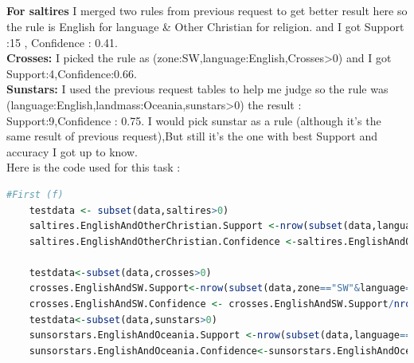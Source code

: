 \documentclass{article}
\begin{document}
	\subsection*{}
	\textbf{For saltires} I merged two rules from previous request to get better result here so the rule is English for language \& Other Christian for religion. and I got Support :15 , Confidence : 0.41.\\
	\textbf{Crosses:} I picked the rule as (zone:SW,language:English,Crosses>0) and I got Support:4,Confidence:0.66.\\
	\textbf{Sunstars:} I used the previous request tables to help me judge so the rule was (language:English,landmass:Oceania,sunstars>0) the result : Support:9,Confidence : 0.75.
	I would pick sunstar as a rule (although it's the same result of previous request),But still it's the one with best Support and accuracy I got up to know.\\
	Here is the code used for this task :
	\begin{lstlisting}[language=R]
	#First (f)
	testdata <- subset(data,saltires>0)
	saltires.EnglishAndOtherChristian.Support <-nrow(subset(data,language=="English"&religion=="Other Christian" & saltires>0))
	saltires.EnglishAndOtherChristian.Confidence <-saltires.EnglishAndOtherChristian.Support /nrow(subset(data,language=="English"&religion=="Other Christian"))
	
	testdata<-subset(data,crosses>0)
	crosses.EnglishAndSW.Support<-nrow(subset(data,zone=="SW"&language=="English"&crosses>0))
	crosses.EnglishAndSW.Confidence <- crosses.EnglishAndSW.Support/nrow(subset(data,zone=="SW" & language =="English"))
	testdata<-subset(data,sunstars>0)
	sunsorstars.EnglishAndOceania.Support <-nrow(subset(data,language=="English"&landmass=="Oceania"&sunstars>0))
	sunsorstars.EnglishAndOceania.Confidence<-sunsorstars.EnglishAndOceania.Support/nrow(subset(data,language=="English"&landmass=="Oceania"))
	\end{lstlisting}
\end{document}
